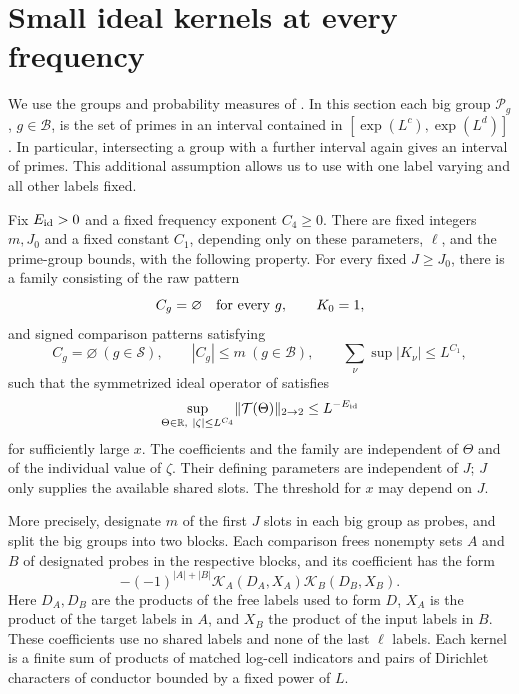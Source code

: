 \section{Small ideal kernels at every frequency}\label{sec:ideal}

We use the groups and probability measures of .
In this section each big group $\mathcal P_g$, $g\in\mathcal B$, is
the set of primes in an interval contained in
$[\exp(L^c),\exp(L^d)]$.  In particular, intersecting a group with a
further interval again gives an interval of primes.  This additional
assumption allows us to use  with one label varying and all
other labels fixed.

\begin{theorem}
\label{thm:ideal}
Fix $E_{\rm id}>0$ and a fixed frequency exponent $C_4\geq0$.
There are fixed integers $m,J_0$ and a fixed constant $C_1$, depending
only on these parameters, $\ell$, and the prime-group bounds, with the
following property.  For every fixed $J\geq J_0$, there is a family
consisting of the raw pattern
\[
 C_g=\varnothing\quad\hbox{for every }g,\qquad K_0=1,
\]
and signed comparison patterns satisfying
\[
 C_g=\varnothing\ (g\in\mathcal S),\qquad
 |C_g|\leq m\ (g\in\mathcal B),\qquad
 \sum_\nu\sup|K_\nu|\leq L^{C_1},
\]
such that the symmetrized ideal operator of 
satisfies
\begin{equation}\label{eq:ideal-small-norm}
 \sup_{\Theta\in\mathbb R,\ |\zeta|\leq L^{C_4}}
 \lVert \mathcal T(\Theta)\rVert_{2\to2}\leq L^{-E_{\rm id}}
\end{equation}
for sufficiently large $x$.  The coefficients and the family are
independent of $\Theta$ and of the individual value of $\zeta$.
Their defining parameters are independent of $J$; $J$ only supplies
the available shared slots.  The threshold for $x$ may depend on $J$.

More precisely, designate $m$ of the first $J$ slots in each big group
as probes, and split the big groups into two blocks. Each comparison
frees nonempty sets $A$ and $B$ of designated probes in the respective
blocks, and its coefficient has the form
\begin{equation}\label{eq:ideal-comparison-coefficient}
 -(-1)^{|A|+|B|}\mathcal K_A(D_A,X_A)
                         \mathcal K_B(D_B,X_B).
\end{equation}
Here $D_A,D_B$ are the products of the free labels used to form $D$,
$X_A$ is the product of the target labels in $A$, and $X_B$ the
product of the input labels in $B$.  These coefficients use no
shared labels and none of the last $\ell$ labels.  Each kernel is
a finite sum of products of matched log-cell indicators and pairs of
Dirichlet characters of conductor bounded by a fixed power of $L$.
\end{theorem}

